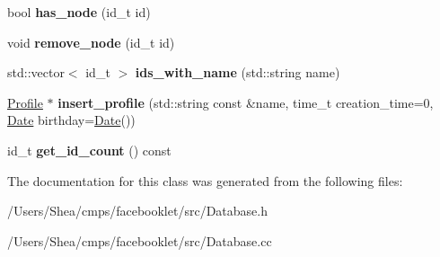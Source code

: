 \begin{DoxyCompactItemize}
\item 
\hypertarget{classfb_1_1_database_a92c3028d238865d57c94881431465e76}{bool {\bfseries has\+\_\+node} (id\+\_\+t id)}\label{classfb_1_1_database_a92c3028d238865d57c94881431465e76}

\item 
\hypertarget{classfb_1_1_database_ab2ccc687a520e876da67f6620b75308c}{void {\bfseries remove\+\_\+node} (id\+\_\+t id)}\label{classfb_1_1_database_ab2ccc687a520e876da67f6620b75308c}

\item 
\hypertarget{classfb_1_1_database_a94dc36e64c814292188de74e6da46024}{std\+::vector$<$ id\+\_\+t $>$ {\bfseries ids\+\_\+with\+\_\+name} (std\+::string name)}\label{classfb_1_1_database_a94dc36e64c814292188de74e6da46024}

\item 
\hypertarget{classfb_1_1_database_a9c37fa3f59a267b5eb645cf2c661713b}{\hyperlink{classfb_1_1_profile}{Profile} $\ast$ {\bfseries insert\+\_\+profile} (std\+::string const \&name, time\+\_\+t creation\+\_\+time=0, \hyperlink{structfb_1_1_date}{Date} birthday=\hyperlink{structfb_1_1_date}{Date}())}\label{classfb_1_1_database_a9c37fa3f59a267b5eb645cf2c661713b}

\item 
\hypertarget{classfb_1_1_database_a8bfe54302e8bdb396a1671104f06e3c2}{id\+\_\+t {\bfseries get\+\_\+id\+\_\+count} () const }\label{classfb_1_1_database_a8bfe54302e8bdb396a1671104f06e3c2}

\end{DoxyCompactItemize}


The documentation for this class was generated from the following files\+:\begin{DoxyCompactItemize}
\item 
/\+Users/\+Shea/cmps/facebooklet/src/Database.\+h\item 
/\+Users/\+Shea/cmps/facebooklet/src/Database.\+cc\end{DoxyCompactItemize}
